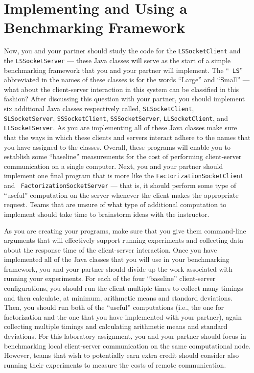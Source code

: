 \section*{Implementing and Using a Benchmarking Framework}

Now, you and your partner should study the code for the {\tt LSSocketClient} and the {\tt LSSocketServer} --- these Java
classes will serve as the start of a simple benchmarking framework that you and your partner will implement. The ``{\tt
LS}'' abbreviated in the names of these classes is for the words ``Large'' and ``Small'' --- what about the
client-server interaction in this system can be classified in this fashion? After discussing this question with your
partner, you should implement six additional Java classes respectively called, {\tt SLSocketClient}, {\tt
SLSocketServer}, {\tt SSSocketClient}, {\tt SSSocketServer}, {\tt LLSocketClient}, and {\tt LLSocketServer}. As you are
implementing all of these Java classes make sure that the ways in which these clients and servers interact adhere to the
names that you have assigned to the classes. Overall, these programs will enable you to establish some ``baseline''
measurements for the cost of performing client-server communication on a single computer. Next, you and your partner
should implement one final program that is more like the {\tt FactorizationSocketClient} and {\tt
FactorizationSocketServer} --- that is, it should perform some type of ``useful'' computation on the server whenever the
client makes the appropriate request. Teams that are unsure of what type of additional computation to
implement should take time to brainstorm ideas with the instructor.

As you are creating your programs, make sure that you give them command-line arguments that will effectively support
running experiments and collecting data about the response time of the client-server interaction. Once you have
implemented all of the Java classes that you will use in your benchmarking framework, you and your partner should divide
up the work associated with running your experiments. For each of the four ``baseline'' client-server configurations,
you should run the client multiple times to collect many timings and then calculate, at minimum, arithmetic means and
standard deviations. Then, you should run both of the ``useful'' computations (i.e., the one for factorization and the
one that you have implemented with your partner), again collecting multiple timings and calculating arithmetic means and
standard deviations. For this laboratory assignment, you and your partner should focus in benchmarking local
client-server communication on the same computational node. However, teams that wish to potentially earn extra credit
should consider also running their experiments to measure the costs of remote communication.

